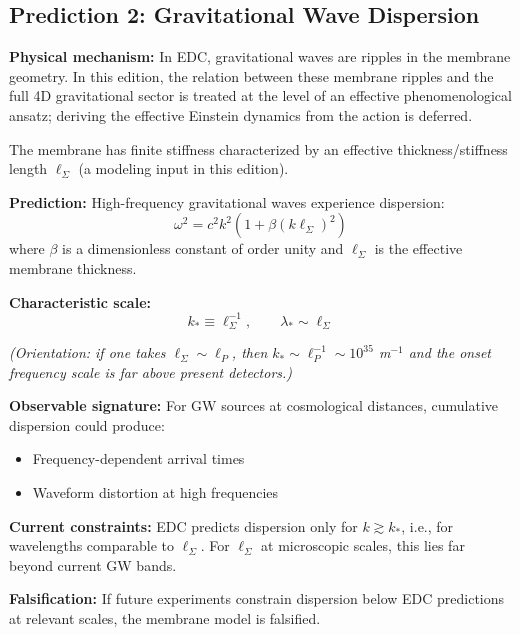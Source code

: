 \newpage

\subsection{Prediction 2: Gravitational Wave Dispersion}

\begin{tcolorbox}[colback=red!5,colframe=red!70,title=Prediction Pr2: GW Dispersion from Membrane Stiffness]

\textbf{Physical mechanism:} In EDC, gravitational waves are ripples in the membrane geometry. In this edition, the relation between these membrane ripples and the full 4D gravitational sector is treated at the level of an effective phenomenological ansatz; deriving the effective Einstein dynamics from the action is deferred.

The membrane has finite stiffness characterized by an effective thickness/stiffness length $\ell_\Sigma$ (a modeling input in this edition).

\textbf{Prediction:} High-frequency gravitational waves experience dispersion:
\begin{equation}
\omega^2 = c^2 k^2 \left(1 + \beta (k \ell_\Sigma)^2\right)
\label{eq:gw_dispersion}
\end{equation}
where $\beta$ is a dimensionless constant of order unity and $\ell_\Sigma$ is the effective membrane thickness.

\textbf{Characteristic scale:}
\begin{equation}
k_* \equiv \ell_\Sigma^{-1}, \qquad \lambda_* \sim \ell_\Sigma
\end{equation}

\textit{(Orientation: if one takes $\ell_\Sigma \sim \ell_P$, then $k_* \sim \ell_P^{-1} \sim 10^{35}$ m$^{-1}$ and the onset frequency scale is far above present detectors.)}

\textbf{Observable signature:} For GW sources at cosmological distances, cumulative dispersion could produce:
\begin{itemize}
    \item Frequency-dependent arrival times
    \item Waveform distortion at high frequencies
\end{itemize}

\textbf{Current constraints:} EDC predicts dispersion only for $k \gtrsim k_*$, i.e., for wavelengths comparable to $\ell_\Sigma$. For $\ell_\Sigma$ at microscopic scales, this lies far beyond current GW bands.

\textbf{Falsification:} If future experiments constrain dispersion below EDC predictions at relevant scales, the membrane model is falsified.
\end{tcolorbox}

